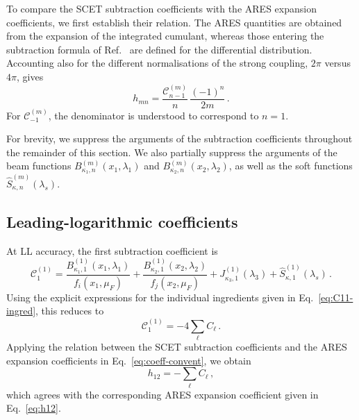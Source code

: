 To compare the SCET subtraction coefficients with the \textsc{ARES}
expansion coefficients, we first establish their relation. The
\textsc{ARES} quantities are obtained from the expansion of the
integrated cumulant, whereas those entering the subtraction formula of
Ref.~\cite{Gaunt:2015pea} are defined for the differential distribution.
Accounting also for the different normalisations of the strong coupling,
$2\pi$ versus $4\pi$, gives
\begin{equation}
\label{eq:coeff-convent}
h_{mn}=\frac{\mathcal{C}_{n-1}^{(m)}}{n}\,\frac{(-1)^n}{2m}\,.
\end{equation}
For $\mathcal{C}_{-1}^{(m)}$, the denominator is understood to
correspond to $n=1$.

For brevity, we suppress the arguments of the subtraction coefficients
throughout the remainder of this section. We also partially suppress the
arguments of the beam functions
$B_{\kappa_1,n}^{(m)}(x_1,\lambda_1)$ and
$B_{\kappa_2,n}^{(m)}(x_2,\lambda_2)$, as well as the soft functions
$\widehat{S}_{\kappa,n}^{(m)}(\lambda_s)$.


\subsection{Leading-logarithmic  coefficients}
\label{subsec:LL-coeff}

At LL accuracy, the first subtraction coefficient is
\begin{equation}
\label{eq:C11}
    \mathcal{C}_1^{(1)}=\frac{B_{\kappa_1,1}^{(1)}(x_1,\lambda_1)}{f_i(x_1,\mu_F)}+\frac{B_{\kappa_2,1}^{(1)}(x_2,\lambda_2)}{f_j(x_2,\mu_F)}+
    J_{\kappa_3,1}^{(1)}(\lambda_3)
    +\widehat{S}^{(1)}_{\kappa,1}\left(\lambda_s\right)\,.
\end{equation}
Using the explicit expressions for the individual ingredients given in
Eq.~\eqref{eq:C11-ingred}, this reduces to
\begin{equation}
    \mathcal{C}^{(1)}_1=-4\sum_{\ell}C_{\ell}\,.
\end{equation}
Applying the relation between the SCET subtraction coefficients and the
\textsc{ARES} expansion coefficients in Eq.~\eqref{eq:coeff-convent}, we
obtain
\begin{equation}
    h_{12}=-\sum_{\ell}C_{\ell}\,,
\end{equation}
which agrees with the corresponding \textsc{ARES} expansion coefficient
given in Eq.~\eqref{eq:h12}.

